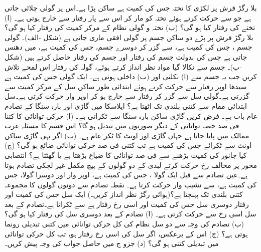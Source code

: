بلا رگڑ فرش پر  لکڑی کا تختہ جس کی کمیت  ہے ساکن  پڑا  ہے۔اس پر   گولی چلائی جاتی ہے جو  سے حرکت کرتے ہوئے تختہ کو مار کر اس  سے پار  رفتار سے   خارج ہوتی ہے۔ (ا) تختے  کی رفتار کیا ہو گی؟ (ب)  تختہ و گولی نظام کے مرکز کمیت کی رفتار کیا ہو گی؟
بلا رگڑ فرش پر پڑے  دو ساکن  جسم پر  گولی افقی ماری جاتی ہے (شکل -الف)۔ گولی جسم ، جس کی کمیت  ہے، سے گزر کر دوسرے جسم، جس کی کمیت  ہے، میں دھنس جاتی ہے جس کی بدولت  جسم  کی رفتار  اور جسم  کی رفتار   حاصل کرتے ہیں (شکل -ب)۔ جسم  سے نکالا گیا مواد نظر انداز کرتے ہوئے، گولہ کی رفتار اس لمحے تلاش کریں جب یہ جسم  سے (ا) نکلتی اور (ب) داخلی ہوتی ہے۔
ایک گولی جس کی کمیت  ہے  سیدھا اوپر  رفتار سے  حرکت  کرتے ہوئے  ابتدائی طور ساکن   سل کے مرکز کمیت سے گزرتی ہے۔گولی سل سے گزر کر  رفتار سے خارج ہو کر اوپر وار حرکت کرتی ہے۔سل ابتدائی مقام سے کتنی بلندی تک اٹھتا ہے؟
ایلاسکا  میں گاڑی اور  بارہ سنگا  کے تصادم عام بات ہے۔ فرض کریں  گاڑی   ساکن  بارہ سنگا سے ٹکراتی ہے۔ (ا)  حرکی توانائی کا کتنا فی صد حصہ توانائی   کے دیگر  صورتوں میں تبدیل ہو گا؟ اس قسم کا مسئلہ  عرب  ممالک میں پایا جاتا ہے جہاں گاڑی اور اونٹ کا ٹکر عام ہے۔ (ب) اگر یہی گاڑی  ساکن  اونٹ  سے ٹکرائے  جس کی کمیت    ہے تب  کتنی فی صد  حرکی توانائی  ضائع ہو گی؟ (ج) کیا جانور کی کمیت بڑھنے سے  فی صد توانائی کا ضیاع بڑھتا ہے یا گھٹتا ہے؟
انتصابی محور پر مخالف رخ حرکت کرتے  لبدی  کے دو گولوں کے بیچ مکمل غیر لچکی تصادم ہوتا ہے۔عین تصادم سے قبل ایک گولا ، جس کی کمیت   ہے،    اوپر وار  اور دوسرا گولا، جس کی کمیت  ہے،  سے  نشیب وار حرکت کرتا ہے۔ نقطہ تصادم سے دونوں گولوں  کا مجموعہ کتنی بلندی تک پہنچتا ہے؟(ہوائی رگڑ نظر انداز کریں۔)
ایک سل جس کی کمیت  اور رفتار   دوسری  سل جس کی کمیت  اور اسی رخ رفتار  ہے سے ٹکراتا ہے۔تصادم کے بعد  سل اسی رخ  سے حرکت کرتی ہے۔ (ا)  تصادم کے بعد دوسری سل کی رفتار کیا ہو گی؟ (ب)  تصادم کی وجہ سے دو  سل نظام کی کل  حرکی توانائی میں  کتنی تبدیلی رونما ہوتی ہے؟ (ج) اس کے برعکس، اگر   سل  کی اسی رخ رفتار  ہو، تب کل حرکی توانائی میں تبدیلی کتنی ہو گی؟ (د)  جزو ج میں حاصل جواب کی وجہ پیش کریں۔
